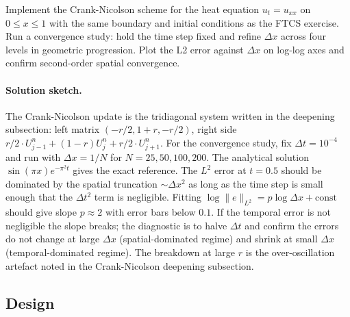 \begin{exercise}
Implement the Crank-Nicolson scheme for the heat equation
$u_{t} = u_{xx}$ on $0 \leq x \leq 1$ with the same boundary and
initial conditions as the FTCS exercise. Run a convergence
study: hold the time step fixed and refine $\Delta x$ across
four levels in geometric progression. Plot the L2 error against
$\Delta x$ on log-log axes and confirm second-order spatial
convergence.

\paragraph{Solution sketch.}
The Crank-Nicolson update is the tridiagonal system written in
the deepening subsection: left matrix $(-r/2, 1 + r, -r/2)$,
right side $r/2 \cdot U_{j-1}^{n} + (1 - r) U_{j}^{n} + r/2
\cdot U_{j+1}^{n}$. For the convergence study, fix $\Delta t =
10^{-4}$ and run with $\Delta x = 1/N$ for $N = 25, 50, 100, 200$.
The analytical solution $\sin(\pi x) e^{-\pi^{2} t}$ gives the
exact reference. The $L^{2}$ error at $t = 0.5$ should be
dominated by the spatial truncation $\sim \Delta x^{2}$ as long
as the time step is small enough that the $\Delta t^{2}$ term is
negligible. Fitting $\log\|e\|_{L^{2}} = p \log \Delta x +
\text{const}$ should give slope $p \approx 2$ with error bars
below $0.1$. If the temporal error is not negligible the slope
breaks; the diagnostic is to halve $\Delta t$ and confirm the
errors do not change at large $\Delta x$ (spatial-dominated
regime) and shrink at small $\Delta x$ (temporal-dominated
regime). The breakdown at large $r$ is the over-oscillation
artefact noted in the Crank-Nicolson deepening subsection.
\end{exercise}

\subsection*{Design}

